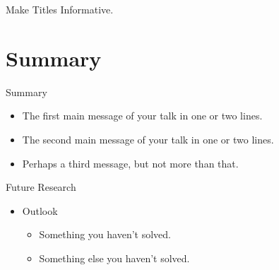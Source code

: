 \documentclass{beamer}
\begin{document}
\begin{frame}{Make Titles Informative.}
\end{frame}

\section*{Summary}

\begin{frame}{Summary}

\begin{itemize}
  \item The \alert{first main message} of your talk in one or two lines.
  \item The \alert{second main message} of your talk in one or two lines.
  \item Perhaps a \alert{third message}, but not more than that.
\end{itemize}

\end{frame}

\begin{frame}{Future Research}
\begin{itemize}
  \item Outlook
  \begin{itemize}
    \item Something you haven't solved.
    \item Something else you haven't solved.
  \end{itemize}
  \end{itemize}
\end{frame}
\end{document}
